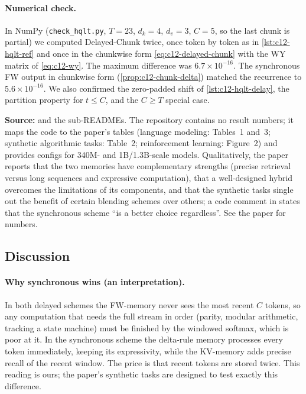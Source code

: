 \paragraph{Numerical check.} In NumPy (\texttt{check\_hqlt.py}, $T=23$, $d_k=4$, $d_v=3$, $C=5$,
so the last chunk is partial) we computed Delayed-Chunk twice, once token by token as in
\cref{lst:c12-hqlt-ref} and once in the chunkwise form \eqref{eq:c12-delayed-chunk} with the WY
matrix of \eqref{eq:c12-wy}. The maximum difference was $6.7\times10^{-16}$. The synchronous FW
output in chunkwise form (\cref{prop:c12-chunk-delta}) matched the recurrence to
$5.6\times10^{-16}$. We also confirmed the zero-padded shift of \cref{lst:c12-hqlt-delay}, the
partition property for $t\le C$, and the $C\ge T$ special case.

\begin{results}
\textbf{Source:}  and the sub-READMEs. The
repository contains no result numbers; it maps the code to the paper's tables (language modeling:
Tables~1 and~3; synthetic algorithmic tasks: Table~2; reinforcement learning: Figure~2) and
provides configs for 340M- and 1B/1.3B-scale models. Qualitatively, the paper reports that the
two memories have complementary strengths (precise retrieval versus long sequences and expressive
computation), that a well-designed hybrid overcomes the limitations of its components, and that
the synthetic tasks single out the benefit of certain blending schemes over others; a code
comment in  states that the synchronous scheme ``is a better choice
regardless''. See the paper for numbers.
\end{results}

\subsection{Discussion}

\paragraph{Why synchronous wins (an interpretation).} In both delayed schemes the FW-memory
never sees the most recent $C$ tokens, so any computation that needs the full stream in order
(parity, modular arithmetic, tracking a state machine) must be finished by the windowed softmax,
which is poor at it. In the synchronous scheme the delta-rule memory processes every token
immediately, keeping its expressivity, while the KV-memory adds precise recall of the recent
window. The price is that recent tokens are stored twice. This reading is ours; the paper's
synthetic tasks are designed to test exactly this difference.

